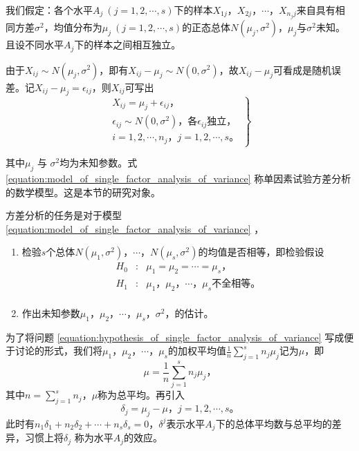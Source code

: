 我们假定：各个水平$ A_j\ \left(j=1,2,\cdots,s\right) $下的样本$ X_{1j} $，$ X_{2j} $，$ \cdots $，$ X_{n_{j}j} $来自具有相同方差$ \sigma^2 $，均值分布为$ \mu_j\ (j=1,2,\cdots,s) $的正态总体$ N(\mu_j, \sigma^2) $，$ \mu_j $与$ \sigma^2 $未知。且设不同水平$ A_j $下的样本之间相互独立。

由于$ X_{ij} \sim N\left( \mu_j, \sigma^2\right)  $，即有$ X_{ij} - \mu_j \sim N\left( 0, \sigma^2\right)  $，故$ X_{ij} - \mu_j $可看成是随机误差。记$ X_{ij} - \mu_j = \epsilon_{ij} $，则$ X_{ij} $可写出
\begin{equation}\label{equation:model_of_single_factor_analysis_of_variance}
	\left. 
	\begin{array}{l}
		X_{ij} = \mu_j + \epsilon_{ij} \text{，} \\
		\epsilon_{ij} \sim N\left( 0, \sigma^2\right)  \text{，各} \epsilon_{ij} \text{独立，} \\
		i = 1, 2, \cdots, n_j \text{，} j = 1,2,\cdots, s\text{。}
	\end{array}
	\right\rbrace 
\end{equation}

其中$ \mu_j $ 与 $ \sigma^2 $均为未知参数。式 \ref{equation:model_of_single_factor_analysis_of_variance} 称单因素试验方差分析的数学模型。这是本节的研究对象。

方差分析的任务是对于模型 \ref{equation:model_of_single_factor_analysis_of_variance} ，
\begin{enumerate}
	\item 检验$ s $个总体$ N\left( \mu_1, \sigma^2\right)  $，$ \cdots $，$ N\left( \mu_s, \sigma^2\right) $的均值是否相等，即检验假设
		\begin{equation}\label{equation:hypothesis_of_single_factor_analysis_of_variance}
			\begin{array}{rcl}
				H_{0} & : & \mu_1 = \mu_2 = \cdots = \mu_s \text{，}\\
				H_{1} & : & \mu_1 \text{，} \mu_2 \text{，} \cdots \text{，} \mu_s \text{不全相等} \text{。}\\
			\end{array}
		\end{equation}
	\item 作出未知参数$ \mu_1 $，$ \mu_2 $，$ \cdots $，$ \mu_s $，$ \sigma^2 $，的估计。
\end{enumerate}

为了将问题 \ref{equation:hypothesis_of_single_factor_analysis_of_variance} 写成便于讨论的形式，我们将$ \mu_1 $，$ \mu_2 $，$ \cdots $，$ \mu_s $的加权平均值$ \displaystyle \frac{1}{n}\sum_{j=1}^{s}n_{j}\mu_{j} $记为$ \mu $，即
\begin{equation}\label{eq:mu_of_single_factor_analysis_of_variance}
	\mu = \frac{1}{n}\sum_{j=1}^{s}n_{j}\mu_{j} \text{，}
\end{equation}
其中$ \displaystyle n = \sum_{j=1}^{s}n_j $，$ \mu $称为总平均。再引入
\begin{equation}
	\delta_j = \mu_j - \mu \text{，} j = 1, 2, \cdots, s \text{。}
\end{equation}
此时有$ n_1\delta_1 + n_2\delta_2 + \cdots + n_s\delta_s = 0 $，$ \delta^j $表示水平$ A_j $下的总体平均数与总平均的差异，习惯上将$ \delta_j $ 称为水平$ A_j $的效应。

